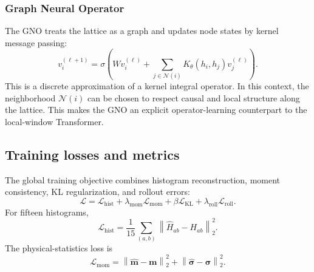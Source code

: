 \documentclass[11pt,a4paper]{article}
\providecommand{\norm}[1]{\left\lVert#1\right\rVert}
\begin{document}
\begin{sloppypar}
\subsubsection{Graph Neural Operator}
The GNO treats the lattice as a graph and updates node states by kernel message passing:
\begin{equation}
    v_i^{(\ell+1)}
    =
    \sigma\left(
    Wv_i^{(\ell)}
    +
    \sum_{j\in\mathcal{N}(i)}
    K_{\theta}(h_i,h_j)v_j^{(\ell)}
    \right).
    \label{eq:gno_update_v2}
\end{equation}
This is a discrete approximation of a kernel integral operator. In this context, the neighborhood $\mathcal{N}(i)$ can be chosen to respect causal and local structure along the lattice. This makes the GNO an explicit operator-learning counterpart to the local-window Transformer.

\subsection{Training losses and metrics}
The global training objective combines histogram reconstruction, moment consistency, KL regularization, and rollout errors:
\begin{equation}
    \mathcal{L}
    =
    \mathcal{L}_{\mathrm{hist}}
    +
    \lambda_{\mathrm{mom}}\mathcal{L}_{\mathrm{mom}}
    +
    \beta\mathcal{L}_{\mathrm{KL}}
    +
    \lambda_{\mathrm{roll}}\mathcal{L}_{\mathrm{roll}}.
    \label{eq:total_training_loss_v2}
\end{equation}
For fifteen histograms,
\begin{equation}
    \mathcal{L}_{\mathrm{hist}}
    =
    \frac{1}{15}\sum_{(a,b)}
    \norm{\widehat{H}_{ab}-H_{ab}}_2^2.
\end{equation}
The physical-statistics loss is
\begin{equation}
    \mathcal{L}_{\mathrm{mom}}
    =
    \norm{\widehat{\bm{m}}-\bm{m}}_2^2
    +
    \norm{\widehat{\bm{\sigma}}-\bm{\sigma}}_2^2.
\end{equation}


\end{sloppypar}
\end{document}
